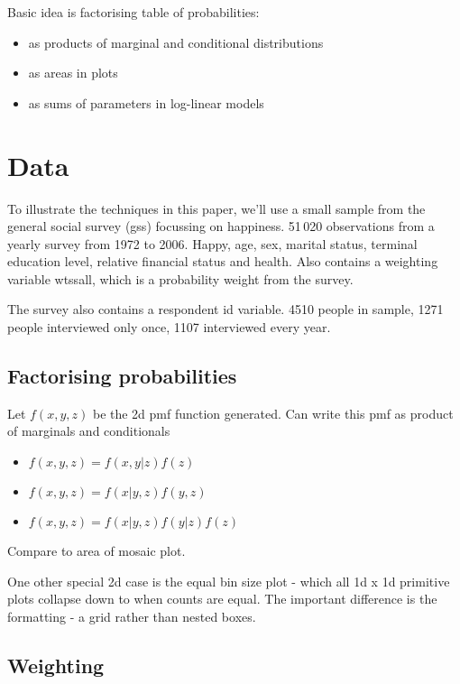 \documentclass[letterpaper,oneside]{scrartcl}
\begin{document}
Basic idea is factorising table of probabilities:

\begin{itemize}
  \item as products of marginal and conditional distributions
  \item as areas in plots
  \item as sums of parameters in log-linear models
\end{itemize}


\section{Data}
\label{sec:data}

To illustrate the techniques in this paper, we'll use a small sample from the general social survey ({\sc gss}) focussing on happiness.  51\,020 observations from a yearly survey from 1972 to 2006.  Happy, age, sex, marital status, terminal education level, relative financial status and health.  Also contains a weighting variable wtssall, which is a probability weight from the survey.

The survey also contains a respondent id variable.  4510 people in sample,  1271 people interviewed only once, 1107 interviewed every year.

\subsection{Factorising probabilities}

Let $f(x, y, z)$ be the 2d pmf function generated.  Can write this pmf as product of marginals and conditionals

\begin{itemize}
  \item $f(x, y, z) = f(x, y | z) f(z)$
  \item $f(x, y, z) = f(x | y, z) f(y, z)$
  \item $f(x, y, z) = f(x | y, z) f(y | z) f(z)$
\end{itemize}

Compare to area of mosaic plot.

One other special 2d case is the equal bin size plot - which all 1d x 1d primitive plots collapse down to when counts are equal.  The important difference is the formatting - a grid rather than nested boxes.

\subsection{Weighting}
\label{sub:weighting}
\end{document}
